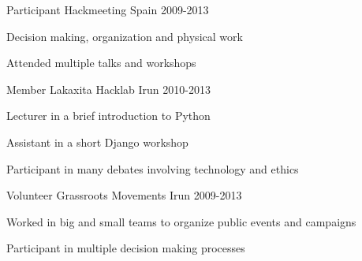 

\begin{cventries}

  \cventry
    {Participant} %
    {Hackmeeting} %
    {Spain} %
    {2009-2013} %
    {
      \begin{cvitems} %
        \item {Decision making, organization and physical work}
        \item {Attended multiple talks and workshops}
      \end{cvitems}
    }

  \cventry
    {Member} %
    {Lakaxita Hacklab} %
    {Irun} %
    {2010-2013} %
    {
      \begin{cvitems} %
        \item {Lecturer in a brief introduction to Python}
        \item {Assistant in a short Django workshop}
        \item {Participant in many debates involving technology and ethics}
      \end{cvitems}
    }

  \cventry
    {Volunteer} %
    {Grassroots Movements} %
    {Irun} %
    {2009-2013} %
    {
      \begin{cvitems} %
        \item {Worked in big and small teams to organize public events and
            campaigns}
        \item {Participant in multiple decision making processes}
      \end{cvitems}
    }

\end{cventries}
